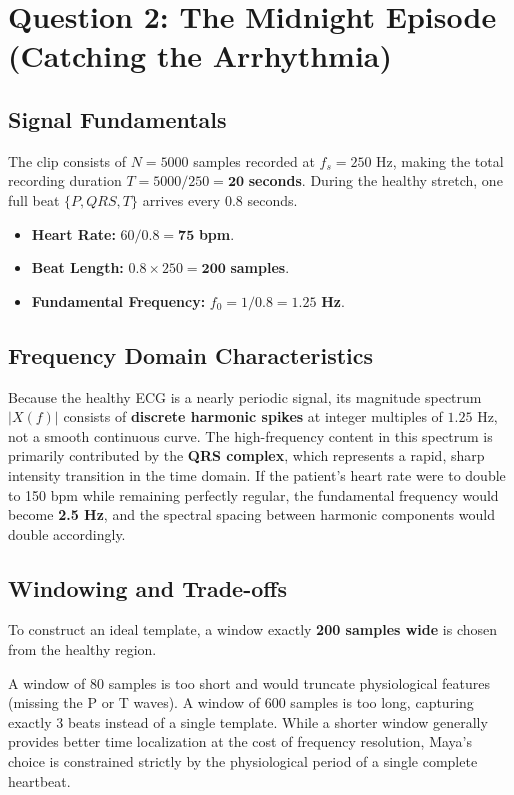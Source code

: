 \documentclass[12pt,a4paper]{article}
\begin{document}
\section{Question 2: The Midnight Episode (Catching the Arrhythmia)}

\subsection{Signal Fundamentals}
The clip consists of $N=5000$ samples recorded at $f_s=250$ Hz, making the total recording duration $T = 5000 / 250 = \mathbf{20}$ \textbf{seconds}.
During the healthy stretch, one full beat $\{P, QRS, T\}$ arrives every 0.8 seconds.
\begin{itemize}[leftmargin=2em]
    \item \textbf{Heart Rate:} $60 / 0.8 = \mathbf{75}$ \textbf{bpm}.
    \item \textbf{Beat Length:} $0.8 \times 250 = \mathbf{200}$ \textbf{samples}.
    \item \textbf{Fundamental Frequency:} $f_0 = 1 / 0.8 = \mathbf{1.25}$ \textbf{Hz}.
\end{itemize}

\subsection{Frequency Domain Characteristics}
Because the healthy ECG is a nearly periodic signal, its magnitude spectrum $|X(f)|$ consists of \textbf{discrete harmonic spikes} at integer multiples of $1.25$ Hz, not a smooth continuous curve. The high-frequency content in this spectrum is primarily contributed by the \textbf{QRS complex}, which represents a rapid, sharp intensity transition in the time domain. If the patient's heart rate were to double to 150 bpm while remaining perfectly regular, the fundamental frequency would become \textbf{2.5 Hz}, and the spectral spacing between harmonic components would double accordingly.

\subsection{Windowing and Trade-offs}
To construct an ideal template, a window exactly \textbf{200 samples wide} is chosen from the healthy region.
\begin{insight_box}
A window of 80 samples is too short and would truncate physiological features (missing the P or T waves). A window of 600 samples is too long, capturing exactly 3 beats instead of a single template. While a shorter window generally provides better time localization at the cost of frequency resolution, Maya's choice is constrained strictly by the physiological period of a single complete heartbeat.
\end{insight_box}
\end{document}
